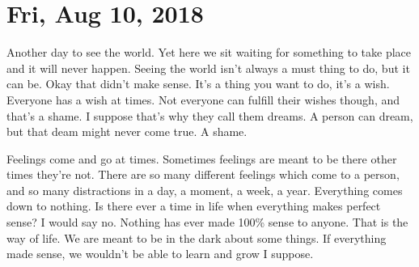 \section{Fri, Aug 10, 2018}

Another day to see the world. Yet here we sit waiting for something to take place and
it will never happen. Seeing the world isn't always a must thing to do, but it can
be. Okay that didn't make sense. It's a thing you want to do, it's a wish. Everyone
has a wish at times. Not everyone can fulfill their wishes though, and that's a
shame. I suppose that's why they call them dreams. A person can dream, but that deam
might never come true. A shame.

Feelings come and go at times. Sometimes feelings are meant to be there other times
they're not. There are so many different feelings which come to a person, and so many
distractions in a day, a moment, a week, a year. Everything comes down to nothing. Is
there ever a time in life when everything makes perfect sense? I would say no.
Nothing has ever made 100\% sense to anyone. That is the way of life. We are meant to
be in the dark about some things. If everything made sense, we wouldn't be able to
learn and grow I suppose.
